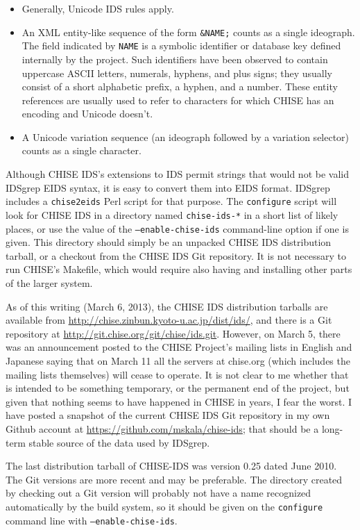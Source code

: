 \documentclass[twocolumn]{report}
\begin{document}
\begin{itemize}
\item Generally, Unicode IDS rules apply.
\item An XML entity-like sequence of the form \texttt{\&NAME;} counts as a
single ideograph.  The field indicated by \texttt{NAME} is a symbolic
identifier or database key defined internally by the project.  Such
identifiers have been observed to contain uppercase ASCII letters, numerals,
hyphens, and plus signs; they usually consist of a short alphabetic
prefix, a hyphen, and a number.  These entity references are usually used to
refer to characters for which CHISE has an encoding and Unicode doesn't.
\item A Unicode variation sequence (an ideograph followed by a variation
selector) counts as a single character.
\end{itemize}

Although CHISE IDS's extensions to IDS permit strings that would not be
valid IDSgrep EIDS syntax, it is easy to convert them into EIDS format. 
IDSgrep includes a \texttt{chise2eids} Perl script for that purpose.  The
\texttt{configure} script will look for CHISE IDS in a directory named
\texttt{chise-ids-*} in a short list of likely places, or use the value of
the \texttt{--enable-chise-ids} command-line option if one is given.  This
directory should simply be an unpacked CHISE IDS distribution tarball, or a
checkout from the CHISE IDS Git repository.  It is not necessary to run
CHISE's Makefile, which would require also having and installing other parts
of the larger system.

As of this writing (March 6, 2013), the CHISE IDS distribution tarballs are
available from \url{http://chise.zinbun.kyoto-u.ac.jp/dist/ids/}, and there
is a Git repository at \url{http://git.chise.org/git/chise/ids.git}. 
However, on March 5, there was an announcement posted to the CHISE Project's
mailing lists in English and Japanese saying that on March 11 all the
servers at chise.org (which includes the mailing lists themselves) will
cease to operate.  It is not clear to me whether that is intended to be
something temporary, or the permanent end of the project, but given that
nothing seems to have happened in CHISE in years, I fear the worst.  I have
posted a snapshot of the current CHISE IDS Git repository in my own Github
account at \url{https://github.com/mskala/chise-ids}; that should be a
long-term stable source of the data used by IDSgrep.

The last distribution tarball of CHISE-IDS was version 0.25 dated June 2010. 
The Git versions are more recent and may be preferable.  The directory
created by checking out a Git version will probably not have a name
recognized automatically by the build system, so it should be given on the
\texttt{configure} command line with \texttt{--enable-chise-ids}.
\end{document}
